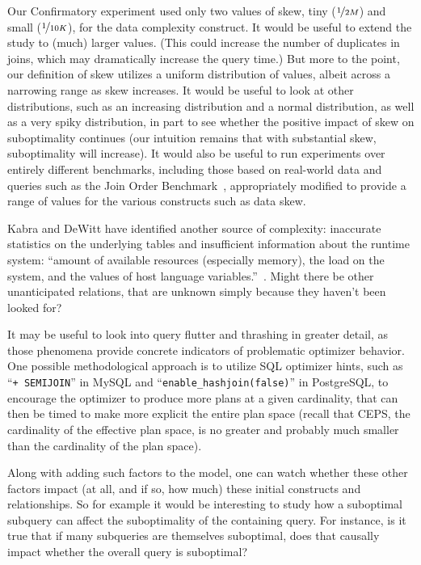 \documentclass[prodmode,acmtods]{acmsmall}
\begin{document}
Our Confirmatory experiment used only two values of skew, tiny
($\nicefrac{1}{2M}$) and small ($\nicefrac{1}{10K}$), for the data complexity
construct. It would be useful to extend the study to (much) larger
values. (This could increase the number of duplicates in joins, which may
dramatically increase the query time.) But more to the point, our definition
of skew utilizes a uniform distribution of values, albeit across a narrowing
range as skew increases. It would be useful to look at other distributions,
such as an increasing distribution and a normal distribution, as well as a
very spiky distribution, in part to see whether the positive impact of skew
on suboptimality continues (our intuition remains that with substantial
skew, suboptimality will increase). It would also be useful to run experiments over
entirely different benchmarks, including those based on real-world data and
queries such as the Join Order Benchmark~\cite{Leis15}, appropriately
modified to provide a range of values for the various constructs such as
data skew.

Kabra and
\hbox{DeWitt} have identified another source of complexity: inaccurate
statistics on the underlying tables and insufficient information about the
runtime system: ``amount of available resources (especially memory), the
load on the system, and the values of host language
variables.''~\cite[p.~106]{kabra98}.  Might there be other unanticipated relations, that are unknown simply because they haven't been
looked for?

It may be useful to look into query flutter and thrashing in greater detail, as those phenomena
provide concrete indicators of problematic optimizer behavior. One
possible methodological approach is to utilize SQL optimizer hints, such as
``{\tt \*+ SEMIJOIN}'' in MySQL and ``{\tt enable\_hashjoin(false)}'' in PostgreSQL,
to encourage the optimizer to produce more plans at a given cardinality,
that can then be timed to make more explicit the entire plan space (recall that
CEPS, the cardinality of the effective plan space, is no greater and
probably much smaller than the cardinality of the plan space).

Along with adding such factors to the model, one can watch whether these
other factors impact (at all, and if so, how much) these initial constructs
and relationships. So for example it would be interesting to study how a suboptimal subquery can affect
the suboptimality of the containing query.  For instance, is it true that if
many subqueries are themselves suboptimal, does that causally impact whether
the overall query is suboptimal? 
\end{document}
